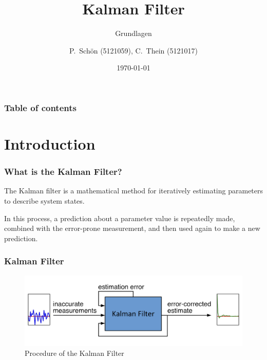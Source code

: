 \documentclass{beamer}
\title{Kalman Filter}
\subtitle{Grundlagen}
\author{P.~Schön (5121059), C.~Thein (5121017)}
\date{\today}
\begin{document}
\frame{\titlepage}

\begin{frame}
    \frametitle{Table of contents}
    \tableofcontents
\end{frame}

\section{Introduction}

\begin{frame}
    \frametitle{What is the Kalman Filter?}
    The Kalman filter is a mathematical method for iteratively estimating parameters to describe
    system states.

    In this process, a prediction about a parameter value is repeatedly made, combined with the
    error-prone measurement, and then used again to make a new prediction.
\end{frame}

\begin{frame}
    \frametitle{Kalman Filter}
    \begin{figure}
        \centering
        \includegraphics[width=1\textwidth]{images/graphics/flow.png} %
        \caption{Procedure of the Kalman Filter\footnotemark}
    \end{figure}
\end{frame}
\end{document}
